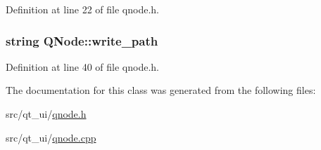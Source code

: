 Definition at line 22 of file qnode.\+h.

\subsubsection[{\texorpdfstring{write\+\_\+path}{write_path}}]{\setlength{\rightskip}{0pt plus 5cm}string Q\+Node\+::write\+\_\+path}\hypertarget{class_q_node_a0967d1922eeb7e39eedca309c7003d23}{}\label{class_q_node_a0967d1922eeb7e39eedca309c7003d23}


Definition at line 40 of file qnode.\+h.



The documentation for this class was generated from the following files\+:\begin{DoxyCompactItemize}
\item 
src/qt\+\_\+ui/\hyperlink{qnode_8h}{qnode.\+h}\item 
src/qt\+\_\+ui/\hyperlink{qnode_8cpp}{qnode.\+cpp}\end{DoxyCompactItemize}
